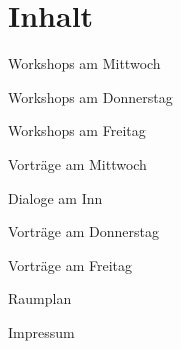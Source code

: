 \section*{Inhalt}

\vspace*{0.35em}%
\noindent Workshops am Mittwoch \dotfill \pageref{mittwoch-workshops}

\vspace*{0.35em}%
\noindent Workshops am Donnerstag \dotfill \pageref{donnerstag-workshops}

\vspace*{0.35em}%
\noindent Workshops am Freitag \dotfill \pageref{freitag-workshops}

\vspace*{0.35em}%
\noindent Vorträge am Mittwoch \dotfill \pageref{mittwoch}

\vspace*{0.35em}%
\noindent Dialoge am Inn \dotfill \pageref{social-event}

\vspace*{0.35em}%
\noindent Vorträge am Donnerstag \dotfill \pageref{donnerstag}

\vspace*{0.35em}%
\noindent Vorträge am Freitag \dotfill \pageref{freitag}

\vspace*{0.35em}%
\noindent Raumplan \dotfill \pageref{raumplan-page}

\vspace*{0.35em}%
\noindent Impressum \dotfill \pageref{impressum}
\newpage
